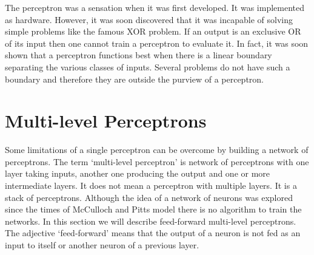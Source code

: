 \documentclass{article}
\numberwithin{equation}{section}
\begin{document}
The perceptron was a sensation when it was first developed. It was 
implemented as hardware. However, it was soon discovered that it was
incapable of solving simple problems like the famous XOR problem. If
an output is an exclusive OR of its input then one cannot train a 
perceptron to evaluate it. In fact, it was soon shown that a perceptron 
functions best when there is a linear boundary separating the various
classes of inputs. Several problems do not have such a boundary and
therefore they are outside the purview of a perceptron.

\section{Multi-level Perceptrons}\label{s3}
Some limitations of a single perceptron can be overcome by building a
network of perceptrons. The term `multi-level perceptron' is network of
perceptrons with one layer taking inputs, another one producing the output
and one or more intermediate layers. It does not mean a perceptron with
multiple layers. It is a stack of perceptrons. Although the idea of a 
network of neurons was explored since the times of McCulloch and Pitts model
there is no algorithm to train the networks. In this section we will 
describe feed-forward multi-level perceptrons. The adjective `feed-forward'
means that the output of a neuron is not fed as an input to itself or
another neuron of a previous layer.
\end{document}
